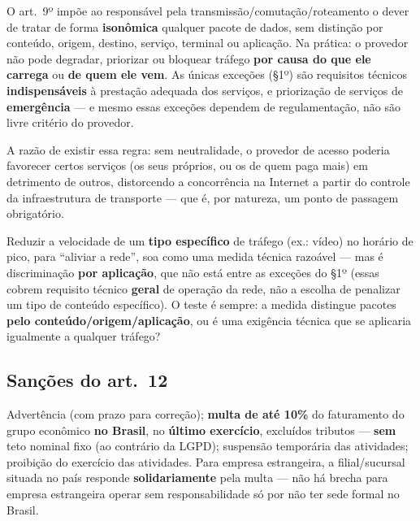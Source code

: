 \begin{conceito}
O art.\ 9º impõe ao responsável pela transmissão/comutação/roteamento o
dever de tratar de forma \textbf{isonômica} qualquer pacote de dados, sem
distinção por conteúdo, origem, destino, serviço, terminal ou aplicação.
Na prática: o provedor não pode degradar, priorizar ou bloquear tráfego
\textbf{por causa do que ele carrega} ou \textbf{de quem ele vem}. As
únicas exceções (§1º) são requisitos técnicos \textbf{indispensáveis} à
prestação adequada dos serviços, e priorização de serviços de
\textbf{emergência} --- e mesmo essas exceções dependem de
regulamentação, não são livre critério do provedor.

A razão de existir essa regra: sem neutralidade, o provedor de acesso
poderia favorecer certos serviços (os seus próprios, ou os de quem paga
mais) em detrimento de outros, distorcendo a concorrência na Internet a
partir do controle da infraestrutura de transporte --- que é, por
natureza, um ponto de passagem obrigatório.
\end{conceito}

\begin{cuidado}
Reduzir a velocidade de um \textbf{tipo específico} de tráfego (ex.:
vídeo) no horário de pico, para “aliviar a rede”, soa como uma medida
técnica razoável --- mas é discriminação \textbf{por aplicação}, que não
está entre as exceções do §1º (essas cobrem requisito técnico
\textbf{geral} de operação da rede, não a escolha de penalizar um tipo de
conteúdo específico). O teste é sempre: a medida distingue pacotes
\textbf{pelo conteúdo/origem/aplicação}, ou é uma exigência técnica que
se aplicaria igualmente a qualquer tráfego?
\end{cuidado}

\subsection{Sanções do art.\ 12}

\begin{conceito}
Advertência (com prazo para correção); \textbf{multa de até 10\%} do
faturamento do grupo econômico \textbf{no Brasil}, no \textbf{último
exercício}, excluídos tributos --- \textbf{sem} teto nominal fixo (ao
contrário da LGPD); suspensão temporária das atividades; proibição do
exercício das atividades. Para empresa estrangeira, a filial/sucursal
situada no país responde \textbf{solidariamente} pela multa --- não há
brecha para empresa estrangeira operar sem responsabilidade só por não ter
sede formal no Brasil.
\end{conceito}

